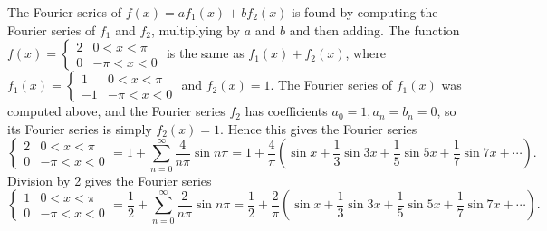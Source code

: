 {The Fourier series of $f(x)=af_1(x)+bf_2(x)$ is found by computing the Fourier series of $f_1$ and $f_2$, multiplying by $a$ and $b$ and then adding.  The function $f(x) =\begin{cases}2&0<x<\pi\\0&-\pi<x<0\end{cases}$ is the same as $f_1(x) +f_2(x)$, where $f_1(x) = \begin{cases}1&0<x<\pi\\-1&-\pi<x<0\end{cases}$ and $f_2(x) = 1$.  The Fourier series of $f_1(x)$ was computed above, and the Fourier series $f_2$ has coefficients $a_0=1,a_n=b_n=0$, so its Fourier series is simply $f_2(x) = 1 $.  Hence this gives the Fourier series $$\begin{cases}2&0<x<\pi\\0&-\pi<x<0\end{cases}=1+\sum_{n=0}^\infty \frac{4}{n\pi}\sin n\pi = 1+\frac{4}{\pi}\left(\sin x + \frac{1}{3}\sin 3x + \frac{1}{5}\sin 5 x + \frac{1}{7}\sin 7x +\cdots\right).$$ 
Division by 2 gives the Fourier series  $$\begin{cases}1&0<x<\pi\\0&-\pi<x<0\end{cases}=\frac12+\sum_{n=0}^\infty \frac{2}{n\pi}\sin n\pi = \frac12+\frac{2}{\pi}\left(\sin x + \frac{1}{3}\sin 3x + \frac{1}{5}\sin 5 x + \frac{1}{7}\sin 7x +\cdots\right).$$


}
